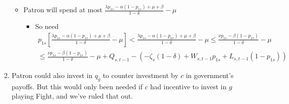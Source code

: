 \documentclass[12pt]{article}
\newcommand{\de}{\delta}
\begin{document}
\begin{enumerate}
\begin{itemize}
			\item Patron will spend at most $\frac{\lambda p_{1s} - \alpha (1-p_{1s}) +\mu + \beta}{1 -\de} - \mu$
				\begin{itemize}
					\item So need
						\begin{multline}
							\textstyle p_{1s}\left[\frac{\lambda p_{1s} - \alpha (1-p_{1s}) +\mu + \beta}{1 -\de} - \mu\right] < \frac{\lambda p_{1s} - \alpha (1-p_{1s}) +\mu + \beta}{1 -\de} - \mu \leq \frac{\nu p_{1s} - \beta (1-p_{1s})}{1 -\de} - \mu \\ \leq \frac{\nu p_{1s} - \beta (1-p_{1s})}{1 -\de} - \mu + Q_{s,t-1} - \left(-\zeta_{s}(1-\de) + W_{s,t-1}p_{1s} + L_{s,t-1}(1-p_{1s})\right)
						\end{multline}
				\end{itemize}
		\end{itemize}
	\item Patron could also invest in $q_g$ to counter investment by $c$ in government's payoffs. But this would only been needed if $c$ had incentive to invest in $g$ playing Fight, and we've ruled that out.
\end{enumerate}
\end{document}
